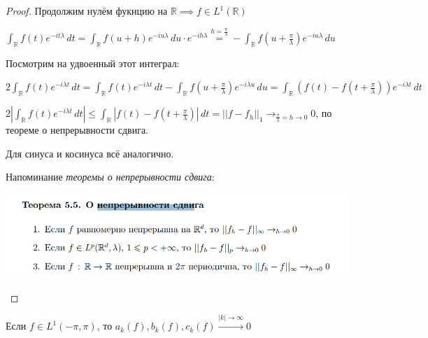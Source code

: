 \begin{proof}
    Продолжим нулём фукнцию на $\mathbb{R} \implies f \in L^1 (\mathbb{R})$

    $\int_{\mathbb{R}} f(t) e^{-i t \lambda} \, dt = \int_{\mathbb{R}} f(u + h) e^{-iu\lambda} \, du \cdot  e^{-ih\lambda} \overset{h = \frac{\pi}{\lambda}}{=} - \int_{\mathbb{R}} f(u + \frac{\pi}{\lambda}) e^{-iu\lambda} \, du$

    Посмотрим на удвоенный этот интеграл:
    
    $2 \int_{\mathbb{R}} f(t) e^{-i \lambda t} \, dt = \int_{\mathbb{R}} f(t) e^{-i \lambda t} \, dt - \int_{\mathbb{R}} f(u + \frac{\pi}{\lambda}) e^{-i\lambda u} \, du = \int_{\mathbb{R}} (f(t) - f(t + \frac{\pi}{\lambda})) e^{-i \lambda t} \, dt $

    $2 \left | \int_{\mathbb{R}} f(t) e^{-i \lambda t} \, dt \right | \leqslant \int_{\mathbb{R}} \left | f(t) - f(t + \frac{\pi}{\lambda}) \right | \, dt = || f - f_h ||_1 \rightarrow_{\frac{\pi}{\lambda} = h \to 0} 0$, по теореме о непрерывности сдвига.

    Для синуса и косинуса всё аналогично.


    Напоминание \textit{теоремы о непрерывности сдвига}:

    \begin{center}
        \includegraphics[width=13cm]{assets/05-fourierreihe/shift-continuous.png}
    \end{center}
\end{proof}

\begin{consequence}
    Если $f \in L^1 (-\pi, \pi)$, то $a_k (f), b_k (f), c_k (f) \overset{|k| \to \infty}{\rightarrow} 0$
\end{consequence}

